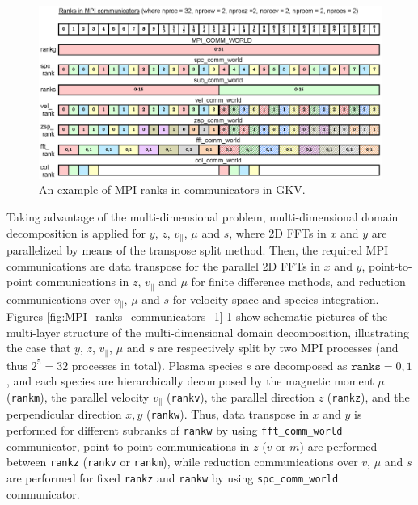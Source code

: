 \begin{figure}[tb!]
  \centering
  \includegraphics[scale=0.8]{./discretization/140627MPI_ranks_communicators_3.eps}
  \caption{An example of MPI ranks in communicators in GKV.}
  \label{fig:MPI_ranks_communicators_3}
\end{figure}
Taking advantage of the multi-dimensional problem, multi-dimensional domain decomposition is applied for $y$, $z$, $v_\parallel$, $\mu$ and $s$, where 2D FFTs in $x$ and $y$ are parallelized by means of the transpose split method. Then, the required MPI communications are data transpose for the parallel 2D FFTs in $x$ and $y$, point-to-point communications in $z$, $v_\parallel$ and $\mu$ for finite difference methods, and reduction communications over $v_\parallel$, $\mu$ and $s$ for velocity-space and species integration. Figures \ref{fig:MPI_ranks_communicators_1}-\ref{fig:MPI_ranks_communicators_3} show schematic pictures of the multi-layer structure of the multi-dimensional domain decomposition, illustrating the case that $y$, $z$, $v_\parallel$, $\mu$ and $s$ are respectively split by two MPI processes (and thus $2^5=32$ processes in total). Plasma species $s$ are decomposed as $\texttt{ranks} = 0, 1$, and each species are hierarchically decomposed by the magnetic moment $\mu$ (\texttt{rankm}), the parallel velocity $v_\parallel$ (\texttt{rankv}), the parallel direction $z$ (\texttt{rankz}), and the perpendicular direction $x,y$ (\texttt{rankw}). Thus, data transpose in $x$ and $y$ is performed for different subranks of \texttt{rankw} by using \texttt{fft\_comm\_world} communicator, point-to-point communications in $z$ ($v$ or  $m$)  are performed between \texttt{rankz} (\texttt{rankv} or \texttt{rankm}), while reduction communications over $v$, $\mu$ and $s$ are performed for fixed \texttt{rankz} and \texttt{rankw} by using \texttt{spc\_comm\_world} communicator.




